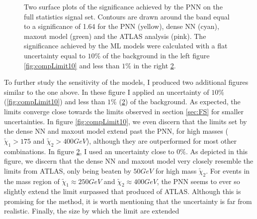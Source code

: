 \begin{figure}
{\begin{subfigure}{.6\textwidth}
        \vspace*{-48.7ex}  %
        \begin{center}
        \footnotesize
        \hspace{-37ex}
        \cite{atlas_search_2021}
        \end{center}
        \vspace*{43ex}
        \vspace{-1.cm}
        \caption{}
        \label{fig:compLimit1}
    \end{subfigure}
    }
    \caption[Two surface plots of the significance comparing sensitivity limits set by \ac{PNN}, dense \ac{NN}, maxout model
    and the \ac{ATLAS} analysis, where the models have assumed a flat uncertainty of $10\%$ and $<1\%$ respectively.]{Two surface plots 
    of the significance achieved by the \ac{PNN} on the full statistics signal set. Contours are drawn around the band equal to a 
    significance of 1.64 for the \ac{PNN} (yellow), dense \ac{NN} (cyan), maxout model (green) and the \ac{ATLAS} analysis \cite{atlas_search_2021} (pink). The 
    significance achieved by the \ac{ML} models were calculated with a flat uncertainty equal to $10\%$ of the background in the left 
    figure \ref{fig:compLimit10} and less than $1\%$ in the right \ref{fig:compLimit1}.}
\end{figure}
To further study the sensitivity of the models, I produced two additional figures similar to the one above. In these figure I applied an uncertainty of 
$10\%$ (\ref{fig:compLimit10}) and less than $1\%$ (\ref{fig:compLimit1}) of the background. As expected, the limits converge close towards the limits 
observed in section \ref{sec:FS} for smaller uncertainties. In figure \ref{fig:compLimit10}, we even discern that the limits set by the dense \ac{NN}
and maxout model extend past the \ac{PNN}, for high masses ($\tilde{\chi}_1>175$ and $\tilde{\chi}_2>400GeV$), although they are outperformed for most other combinations.
In figure \ref{fig:compLimit1}, I used an uncertainty close to $0\%$. As depicted in this figure, we discern that the dense \ac{NN} and maxout model 
very closely resemble the limits from \ac{ATLAS}, only being beaten by $50GeV$ for high mass $\tilde{\chi}_2$. For events in the mass region of
$\tilde{\chi}_1\approx250GeV$ and $\tilde{\chi}_2\approx400GeV$, the \ac{PNN} seems to ever so slightly extend the limit surpassed that produced of \ac{ATLAS}.
Although this is promising for the method, it is worth mentioning that the uncertainty is far from realistic. Finally, the size by which the limit are extended
